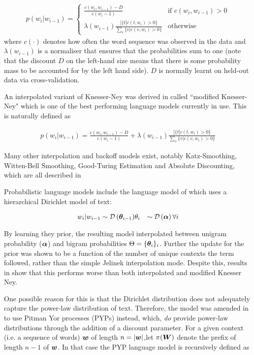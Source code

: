 \begin{align}
p(w_i | w_{i-1}) = \left\{ \begin{array}{lr}
     \frac{c(w_i, w_{i-1}) - D}{c(w_i-1)} & \text{if } c(w_i, w_{i-1}) > 0 \\
     \lambda(w_{i-1})\frac{ | \{t | c(t, w_i) > 0\} }{\sum_v \{v | c(v, w_i) > 0\}} & \text{otherwise}
 \end{array}
\right.
\end{align}
where $c(\cdot)$ denotes how often the word sequence was observed in the data and $\lambda(w_{i-1})$ is a normaliser that ensures that the probabilities sum to one (note that the discount $D$ on the left-hand size means that there is some probability mass to be accounted for by the left hand side). $D$ is normally learnt on held-out data via cross-validation.

An interpolated variant of Knesser-Ney was derived in\cite{Goodman2001} called ``modified Knesser-Ney" which is one of the best performing language models currently in use. This is naturally defined as

\begin{align}
p(w_i | w_{i-1}) = \frac{c(w_i, w_{i-1}) - D}{c(w_i-1)} + \lambda(w_{i-1})\frac{ | \{t | c(t, w_i) > 0\} }{\sum_v \{v | c(v, w_i) > 0\}}
\end{align}

Many other interpolation and backoff models exist, notably Katz-Smoothing, Witten-Bell Smoothing, Good-Turing Estimation and Absolute Discounting, which are all described in \cite{Goodman2001}

Probabilistic language models include the language model of \cite{MacKay1995} which uses a hierarchical Dirichlet model of text:

\begin{align}
w_i|w_{i-1} \sim \mathcal{D} \left( {\bm \theta_{i-1}} \right) & \theta_i & \sim \mathcal{D} \left( {\bm \alpha} \right) \forall i 
\end{align}

By learning they prior, the resulting model interpolated between unigram probability ($\bm \alpha$) and bigram probabilities $\Theta = \{ \bm \theta_i \}_{i}$. Further the update for the prior was shown to be a function of the number of unique contexts the term followed, rather than the simple Jelinek interpolation mode. Despite this, results in \cite{Teh} show that this performs worse than both interpolated and modified Knesser Ney.

One possible reason for this is that the Dirichlet distribution does not adequately capture the power-law distribution of text. Therefore, the model was amended in \cite{Teh} to use Pitman Yor processes (PYPs) instead, which, \emph{do} provide power-law distributions through the addition of a discount parameter. For a given context (i.e. a sequence of words) $\bm w$ of length $n = |\bm w|$,let $\pi(\bm W)$ denote the prefix of length $n-1$ of $\bm w$. In that case the PYP language model is recursively defined as

